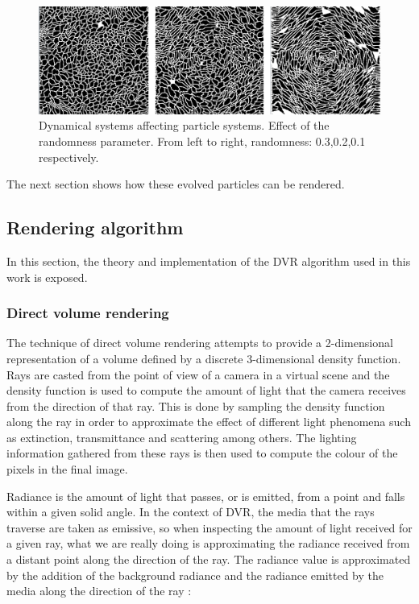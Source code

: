 \documentclass[oneside,a4paper,english,links]{amca}
\begin{document}
\begin{figure}[htb!]
  \centerline{\includegraphics[scale=0.21]{fig4}}
  \caption{Dynamical systems affecting particle systems. Effect of the randomness parameter. From left to right, randomness: 0.3,0.2,0.1 respectively. }
  \label{fg:fig4}
\end{figure}

The next section shows how these evolved particles can be rendered.

\subsection{Rendering algorithm}

In this section, the theory and implementation of the DVR algorithm used in this work is exposed.

\subsubsection{Direct volume rendering}

The technique of direct volume rendering attempts to provide a
2-dimensional representation of a volume defined by a discrete
3-dimensional density function. Rays are casted from the point of view
of a camera in a virtual scene and the density function is used to
compute the amount of light that the camera receives from the
direction of that ray. This is done by sampling the density function
along the ray in order to approximate the effect of different light
phenomena such as extinction, transmittance and scattering among
others. The lighting information gathered from these rays is then
used to compute the colour of the pixels in the final image.

Radiance is the amount of light that passes, or is emitted, from a
point and falls within a given solid angle. In the context of DVR, the
media that the rays traverse are taken as emissive, so when inspecting
the amount of light received for a given ray, what we are really doing
is approximating the radiance received from a distant point along the
direction of the ray. The radiance value is approximated by the
addition of the background radiance and the radiance emitted by the
media along the direction of the ray \citep{Kratz2006} : 
\end{document}
